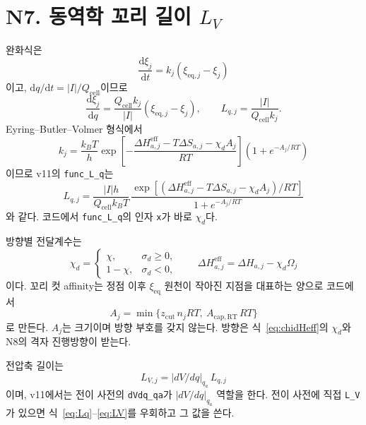 \documentclass[11pt,a4paper]{article}
\newcommand{\dd}{\mathrm{d}}
\newcommand{\eq}{\mathrm{eq}}
\newcommand{\eff}{\mathrm{eff}}
\newcommand{\cell}{\mathrm{cell}}
\begin{document}
\section{N7. 동역학 꼬리 길이 $L_V$}\label{sec:N7}
완화식은
\begin{equation}
\frac{\dd \xi_j}{\dd t}=k_j(\xi_{\eq,j}-\xi_j)
\label{eq:relax}
\end{equation}
이고, $\dd q/\dd t=|I|/Q_{\cell}$이므로
\begin{equation}
\frac{\dd \xi_j}{\dd q}=\frac{Q_{\cell}k_j}{|I|}(\xi_{\eq,j}-\xi_j),
\qquad
L_{q,j}=\frac{|I|}{Q_{\cell}k_j}.
\label{eq:Lqdef}
\end{equation}
Eyring--Butler--Volmer 형식에서
\begin{equation}
k_j=\frac{k_BT}{h}
\exp\!\left[-\frac{\Delta H_{a,j}^{\eff}-T\Delta S_{a,j}-\chi_d A_j}{RT}\right]
\left(1+e^{-A_j/RT}\right)
\label{eq:kuniv}
\end{equation}
이므로 v11의 \texttt{func\_L\_q}는
\begin{equation}
\boxed{\;
L_{q,j}=
\frac{|I|h}{Q_{\cell}k_BT}\,
\frac{\exp[(\Delta H_{a,j}^{\eff}-T\Delta S_{a,j}-\chi_d A_j)/RT]}
{1+e^{-A_j/RT}}\;}
\label{eq:Lq}
\end{equation}
와 같다. 코드에서 \texttt{func\_L\_q}의 인자 \texttt{x}가 바로 $\chi_d$다.

방향별 전달계수는
\begin{equation}
\boxed{\;\chi_d=
\begin{cases}
\chi,&\sigma_d\ge0,\\
1-\chi,&\sigma_d<0,
\end{cases}
\qquad
\Delta H_{a,j}^{\eff}=\Delta H_{a,j}-\chi_d\Omega_j\;}
\label{eq:chidHeff}
\end{equation}
이다. 꼬리 컷 affinity는 정점 이후 $\xi_{\eq}$ 원천이 작아진 지점을 대표하는 양으로 코드에서
\begin{equation}
A_j=\min\{z_{\mathrm{cut}}\,n_jRT,\ A_{\mathrm{cap,RT}}\,RT\}
\label{eq:Acut}
\end{equation}
로 만든다. $A_j$는 크기이며 방향 부호를 갖지 않는다. 방향은 식~\eqref{eq:chidHeff}의 $\chi_d$와 N8의 격자 진행방향이 받는다.

전압축 길이는
\begin{equation}
\boxed{\;L_{V,j}=|dV/dq|_{q_a}\,L_{q,j}\;}
\label{eq:LV}
\end{equation}
이며, v11에서는 전이 사전의 \texttt{dVdq\_qa}가 $|dV/dq|_{q_a}$ 역할을 한다. 전이 사전에 직접 \texttt{L\_V}가 있으면 식~\eqref{eq:Lq}--\eqref{eq:LV}를 우회하고 그 값을 쓴다.
\end{document}
